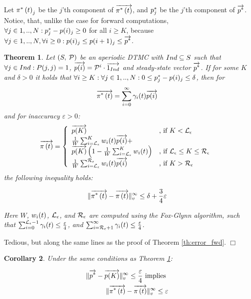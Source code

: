 \documentclass[times, 10pt,twocolumn]{article}
\newtheorem{theorem}{Theorem}
\newtheorem{corollary}[theorem]{Corollary}
\newenvironment{proof}{\trivlist \item[\hskip \labelsep{\bf Proof}]}{\hfill\hbox{$\Box$}\endtrivlist}
\begin{document}
		
		Let $\pi^{*} \left( t \right)_{j}$ be the $j$'th component of $\overrightarrow{\pi^{*} \left( t \right)}$, and $p^{*}_{j}$ be the $j$'th component of $\overrightarrow{p^{*}}$.  Notice, that, unlike the case for forward computations, $\forall j \in 1,..,N : p^{*}_{j} - p(i)_{j} \geq 0$ for all $i \geq K$, because $\forall j \in 1,..,N, \forall i\geq0 : p(i)_{j} \leq p(i+1)_{j} \leq \overrightarrow{p^{*}}$.
		
		\begin{theorem}
			Let $\left( S,\: \mathcal{P} \right)$ be an aperiodic DTMC with $Ind \subseteq S$ such that $\forall j \in Ind : P(j,j) = 1$, $\overrightarrow{p(i)}=\mathcal{P}^{i} \cdot \overrightarrow{1_{Ind}}$ and steady-state vector $\overrightarrow{p^{*}}$. If for some $K$ and $\delta > 0$ it holds that $\forall i \geq K : \forall j \in 1,..,N : 0 \leq p^{*}_{j} - p(i)_{j} \leq \delta$, then for 
			{\small
			\[
				\overrightarrow{\pi^{*} \left( t \right)} = \sum_{i=0}^{\infty}\gamma_{i}(t) \overrightarrow{p(i)}
			\]
			}
			and for inaccuracy $\varepsilon > 0$:
			{\small
			\begin{equation}
				\displaystyle
				\overrightarrow{\pi \left( t \right) } = \left\{
				\begin{array}{ll}
					\overrightarrow{p(K)} & \text{, if } K < \mathcal{L}_{\epsilon}\\
					\frac{1}{W} \sum_{i=\mathcal{L}_{\epsilon}}^{K}w_{i}(t) \overrightarrow{p(i)} + & \\
					\overrightarrow{p(K)} \left(1- \frac{1}{W} \sum_{i=\mathcal{L}_{\epsilon}}^{K}w_{i}(t) \right) & \text{, if } \mathcal{L}_{\epsilon} \leq K \leq \mathcal{R}_{\epsilon}\\
					\frac{1}{W} \sum_{i=\mathcal{L}_{\epsilon}}^{\mathcal{R}_{\epsilon}}w_{i}(t) \overrightarrow{p(i)} & \text{, if } K > \mathcal{R}_{\epsilon}\\
				\end{array}
				\right .
				\nonumber
			\end{equation}
			}
			the following inequality holds:
			{\small
			\begin{fframe}{0.5}{-0.3}
				\[
					\lVert   \overrightarrow{\pi^{*} \left( t \right)} - \overrightarrow{\pi \left( t \right) }   \rVert_{v}^{\infty} \leq \delta + \frac{3}{4} \varepsilon
				\]
			\end{fframe}
			}
			Here $W$, $w_{i}(t)$, $\mathcal{L}_{\epsilon}$, and $\mathcal{R}_{\epsilon}$ are computed using the Fox-Glynn algorithm, such that $\sum_{i=0}^{\mathcal{L}_{\epsilon}-1} \gamma_{i}(t) \leq \frac{\varepsilon}{4}$, and $\sum_{i=\mathcal{R}_{\epsilon}+1}^{\infty} \gamma_{i}(t) \leq \frac{\varepsilon}{4}$.
			\label{th:error_bwd}
		\end{theorem}
		{\small
		\begin{proof}
			Tedious, but along the same lines as the proof of Theorem \ref{th:error_fwd}.
		\end{proof}
		}
		\begin{corollary}
			Under the same conditions as Theorem \ref{th:error_bwd}:
			{\small
			\begin{fframe}{0.6}{-0.3}
				\begin{eqnarray}
					\lVert  \overrightarrow{p^{*}} - \overrightarrow{p(K)}  \rVert_{v}^{\infty} \leq \frac{\varepsilon}{4} \text{ implies } \nonumber \\
					\lVert  \overrightarrow{\pi^{*} \left( t \right)} - \overrightarrow{\pi \left( t \right) }  \rVert_{v}^{\infty}\leq \varepsilon
					\label{eq:our_bwd_cor}
				\end{eqnarray}
			\end{fframe}
			}
		 \end{corollary}
		
\end{document}
